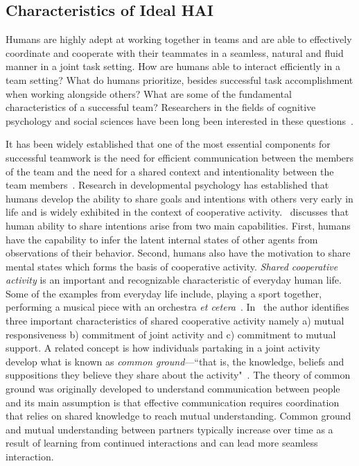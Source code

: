 \documentclass[12pt]{article}
\begin{document}
\subsection{Characteristics of Ideal HAI}
Humans are highly adept at working together in teams and are able to effectively coordinate and cooperate with their teammates in a seamless, natural and fluid manner in a joint task setting. How are humans able to interact efficiently in a team setting?  What do humans prioritize, besides successful task accomplishment when working alongside others? What are some of the fundamental characteristics of a successful team? Researchers in the fields of cognitive psychology and social sciences have been long been interested in these questions~\cite{guastello1998origins,kozlowski2012dynamics, rand2013human}. 

It has been widely established that one of the most essential components for successful teamwork is the need for efficient communication between the members of the team and the need for a shared context and intentionality between the team members~\cite{tomasello2007shared}. Research in developmental psychology has established that humans develop the ability to share goals and intentions with others very early in life and is widely exhibited in the context of cooperative activity.~\cite{tomasello2007shared} discusses that human ability to share intentions arise from two main capabilities. First, humans have the capability to infer the latent internal states of other agents from observations of their behavior. Second, humans also have the motivation to share mental states which forms the basis of cooperative activity. \textit{Shared cooperative activity} is an important and recognizable characteristic of everyday human life. Some of the examples from everyday life include, playing a sport together, performing a musical piece with an orchestra \textit{et cetera}~\cite{bratman1992shared}. In~\cite{bratman1992shared} the author identifies three important characteristics of shared cooperative activity namely a) mutual responsiveness b) commitment of joint activity and c) commitment to mutual support. A related concept is how individuals partaking in a joint activity develop what is known as \textit{common ground}---``that is, the knowledge, beliefs and suppositions they believe they share about the activity"~\cite{clark1996using}. The theory of common ground was originally developed to understand communication between people and its main assumption is that effective communication requires coordination that relies on shared knowledge to reach mutual understanding.  Common ground and mutual understanding between partners typically increase over time as a result of learning from continued interactions and can lead more seamless interaction.
\end{document}
